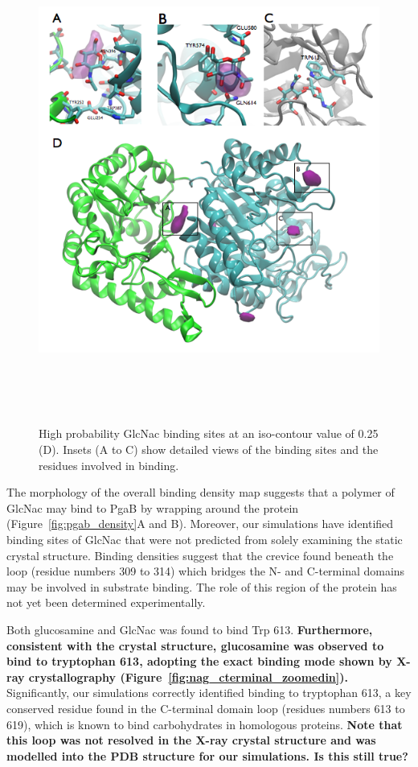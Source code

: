\begin{figure}[htbp]
\centering
\includegraphics[height=6.29in, width=6.12in]{figures/results4/figure_pgab_binding_sites.png}
\caption[GlcNac binding sites]{High probability GlcNac binding sites at an iso-contour value of 0.25 (D). Insets (A to C) show detailed views of the binding sites and the residues involved in binding.}
\label{fig:pgab_binding_sites}
\end{figure}

The morphology of the overall binding density map suggests that a polymer of GlcNac may bind to PgaB by wrapping around the protein (Figure~\ref{fig:pgab_density}A and B). Moreover, our simulations have identified binding sites of GlcNac that were not predicted from solely examining the static crystal structure. Binding densities suggest that the crevice found beneath the loop (residue numbers 309 to 314) which bridges the N- and C-terminal domains may be involved in substrate binding. The role of this region of the protein has not yet been determined experimentally. 

Both glucosamine and GlcNac was found to bind Trp 613.
\textbf{Furthermore, consistent with the crystal structure, glucosamine was observed to bind to tryptophan 613, adopting the exact binding mode shown by X-ray crystallography (Figure~\ref{fig:nag_cterminal_zoomedin}).}
Significantly, our simulations correctly identified binding to tryptophan 613, a key conserved residue found in the C-terminal domain loop (residues numbers 613 to 619), which is known to bind carbohydrates in homologous proteins. \textbf{Note that this loop was not resolved in the X-ray crystal structure and was modelled into the PDB structure for our simulations. Is this still true?}

